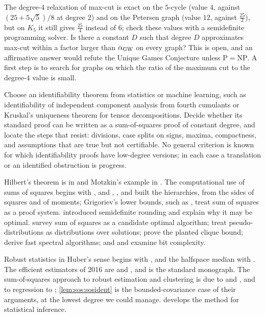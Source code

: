 \begin{refsection}
\begin{exercises}
\item\label{ex:sos:maxcut4} \research The degree-$4$ relaxation of max-cut is exact on the $5$-cycle (value $4$, against $(25+5\sqrt5)/8$ at degree $2$) and on the Petersen graph (value $12$, against $\frac{25}2$), but on $K_5$ it still gives $\frac{25}4$ instead of $6$; check these values with a semidefinite programming solver. Is there a constant $D$ such that degree $D$ approximates max-cut within a factor larger than $\alpha_{\mathrm{GW}}$ on every graph? This is open, and an affirmative answer would refute the Unique Games Conjecture unless $\mathrm{P}=\mathrm{NP}$. A first step is to search for graphs on which the ratio of the maximum cut to the degree-$4$ value is small.

\item\label{ex:sos:ml} \research Choose an identifiability theorem from statistics or machine learning, such as identifiability of independent component analysis from fourth cumulants or Kruskal's uniqueness theorem for tensor decompositions. Decide whether its standard proof can be written as a sum-of-squares proof of constant degree, and locate the steps that resist: divisions, case splits on signs, maxima, compactness, and assumptions that are true but not certifiable. No general criterion is known for which identifiability proofs have low-degree versions; in each case a translation or an identified obstruction is progress.
\end{exercises}

\notesandrefs
Hilbert's theorem is in \textcite{Hilbert1888} and Motzkin's example in \textcite{Motzkin1967}. The computational use of sums of squares begins with \textcite{Shor1987}, and \textcite{Nesterov2000}, \textcite{Parrilo2000}, and \textcite{Lasserre2001} built the hierarchies, from the sides of squares and of moments; Grigoriev's lower bounds, such as \textcite{Grigoriev2001}, treat sum of squares as a proof system. \textcite{GoemansWilliamson1995} introduced semidefinite rounding and \textcite{Khot2007} explain why it may be optimal. \textcite{BarakSteurer2014} survey sum of squares as a candidate optimal algorithm; \textcite{BarakKelnerSteurer2015} treat pseudo-distributions as distributions over solutions; \textcite{Barak2016} prove the planted clique bound; \textcite{Hopkins2016} derive fast spectral algorithms; and \textcite{ODonnell2017} and \textcite{RaghavendraWeitz2017} examine bit complexity.

Robust statistics in Huber's sense begins with \textcite{Huber1964}, and the halfspace median with \textcite{Tukey1975}. The efficient estimators of 2016 are \textcite{Diakonikolas2016} and \textcite{Lai2016}, and \textcite{DiakonikolasKane2023} is the standard monograph. The sum-of-squares approach to robust estimation and clustering is due to \textcite{Kothari2018} and \textcite{HopkinsLi2018}, and to regression to \textcite{Klivans2018}; \cref{lem:sos:sosident} is the bounded-covariance case of their arguments, at the lowest degree we could manage. \textcite{Hopkins2018} develops the method for statistical inference.

\printchapterbib
\end{refsection}
